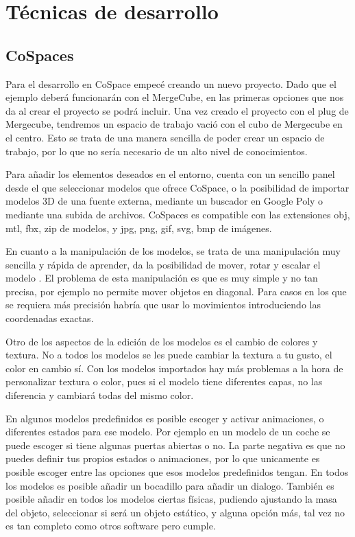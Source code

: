 

\section{Técnicas de desarrollo}
\subsection{CoSpaces}
Para el desarrollo en CoSpace empecé creando un nuevo proyecto. Dado que el ejemplo deberá funcionarán con el MergeCube, en las primeras opciones que nos da al crear el proyecto se podrá incluir.
Una vez creado el proyecto con el plug de Mergecube, tendremos un espacio de trabajo vació con el cubo de Mergecube en el centro. Esto se trata de una manera sencilla de poder crear un espacio de trabajo, por lo que no sería necesario de un alto nivel de conocimientos.

Para añadir los elementos deseados en el entorno, cuenta con un sencillo panel desde el que seleccionar modelos que ofrece CoSpace, o la posibilidad de importar modelos 3D de una fuente externa, mediante un buscador en Google Poly o mediante una subida de archivos. CoSpaces es compatible con las extensiones obj, mtl, fbx, zip de modelos, y jpg, png, gif, svg, bmp de imágenes.

En cuanto a la manipulación de los modelos, se trata de una manipulación muy sencilla y rápida de aprender, da la posibilidad de mover, rotar y escalar el modelo . El problema de esta manipulación es que es muy simple y no tan precisa, por ejemplo no permite mover objetos en diagonal. Para casos en los que se requiera más precisión habría que usar lo movimientos introduciendo las coordenadas exactas.

Otro de los aspectos de la edición de los modelos es el cambio de colores y textura. No a todos los modelos se les puede cambiar la textura a tu gusto, el color en cambio sí. Con los modelos importados hay más problemas a la hora de personalizar textura o color, pues si el modelo tiene diferentes capas, no las diferencia y cambiará todas del mismo color. 

En algunos modelos predefinidos es posible escoger y activar animaciones, o diferentes estados para ese modelo. Por ejemplo en un modelo de un coche se puede escoger si tiene algunas puertas abiertas o no. La parte negativa es que no puedes definir tus propios estados o animaciones, por lo que unicamente es posible escoger entre las opciones que esos modelos predefinidos tengan. En todos los modelos es posible añadir un bocadillo para añadir un dialogo. También es posible añadir en todos los modelos ciertas físicas, pudiendo ajustando la masa del objeto, seleccionar si será un objeto estático, y alguna opción más, tal vez no es tan completo como otros software pero cumple.

